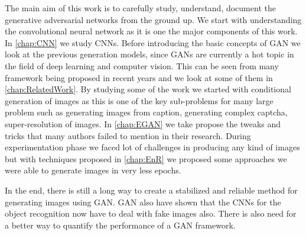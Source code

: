 \doublespacing
{}
\label{chap:Conclusion}

The main aim of this work is to carefully study, understand, document the generative adversarial networks from the ground up. We start with understanding the  convolutional neural network as it is one the major components of this work. In \autoref{chap:CNN} we study CNNs. Before introducing the basic concepts of GAN we look at the previous generation models, since GANs are currently a hot topic in the field of deep learning and computer vision. This can be seen from many framework being proposed in recent years and we look at some of them in \autoref{chap:RelatedWork}. By studying some of the work we started with conditional generation of images as this is one of the key sub-problems for many large problem such as generating images from caption, generating complex captcha, super-resolution of images. In \autoref{chap:EGAN} we take propose the  tweaks and tricks that many authors failed to mention in their research. During experimentation phase we faced lot of challenges in producing any kind of images but with techniques proposed in \autoref{chap:EnR} we proposed some approaches we were able to generate images in very less epochs.
\par
In the end, there is still a long way to create a stabilized and reliable method for generating images using GAN. GAN also have shown that the CNNs for the object recognition now have to deal with fake images also. There is also need for a better way to quantify the  performance of a GAN framework.